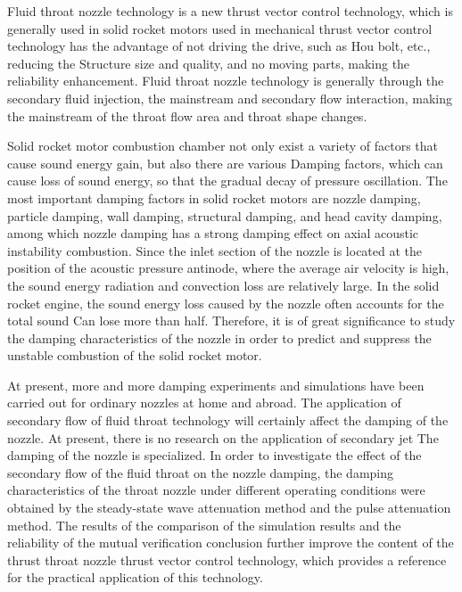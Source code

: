 \begin{enabstract}
 Fluid throat nozzle technology is a new thrust vector control technology, which is generally used in solid rocket motors used in mechanical thrust vector control technology has the advantage of not driving the drive, such as Hou bolt, etc., reducing the Structure size and quality, and no moving parts, making the reliability enhancement. Fluid throat nozzle technology is generally through the secondary fluid injection, the mainstream and secondary flow interaction, making the mainstream of the throat flow area and throat shape changes.
 
 Solid rocket motor combustion chamber not only exist a variety of factors that cause sound energy gain, but also there are various Damping factors, which can cause loss of sound energy, so that the gradual decay of pressure oscillation. The most important damping factors in solid rocket motors are nozzle damping, particle damping, wall damping, structural damping, and head cavity damping, among which nozzle damping has a strong damping effect on axial acoustic instability combustion. Since the inlet section of the nozzle is located at the position of the acoustic pressure antinode, where the average air velocity is high, the sound energy radiation and convection loss are relatively large. In the solid rocket engine, the sound energy loss caused by the nozzle often accounts for the total sound Can lose more than half. Therefore, it is of great significance to study the damping characteristics of the nozzle in order to predict and suppress the unstable combustion of the solid rocket motor.
 
 At present, more and more damping experiments and simulations have been carried out for ordinary nozzles at home and abroad. The application of secondary flow of fluid throat technology will certainly affect the damping of the nozzle. At present, there is no research on the application of secondary jet The damping of the nozzle is specialized. In order to investigate the effect of the secondary flow of the fluid throat on the nozzle damping, the damping characteristics of the throat nozzle under different operating conditions were obtained by the steady-state wave attenuation method and the pulse attenuation method. The results of the comparison of the simulation results and the reliability of the mutual verification conclusion further improve the content of the thrust throat nozzle thrust vector control technology, which provides a reference for the practical application of this technology.
 
\end{enabstract}

